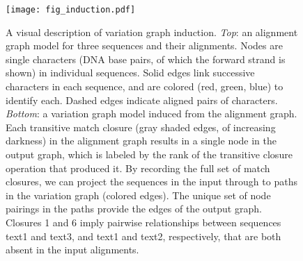 \begin{figure}
   \texttt{[image: fig\_induction.pdf]}
   \caption{
   A visual description of variation graph induction.
   \textit{Top}: an alignment graph model for three sequences and their alignments.
   Nodes are single characters (DNA base pairs, of which the forward strand is shown) in individual sequences.
   Solid edges link successive characters in each sequence, and are colored (red, green, blue) to identify each.
   Dashed edges indicate aligned pairs of characters.
    \textit{Bottom}: a variation graph model induced from the alignment graph.
   Each transitive match closure (gray shaded edges, of increasing darkness) in the alignment graph results in a single node in the output graph, which is labeled by the rank of the transitive closure operation that produced it.
   By recording the full set of match closures, we can project the sequences in the input through to paths in the variation graph (colored edges).
   The unique set of node pairings in the paths provide the edges of the output graph.
   Closures 1 and 6 imply pairwise relationships between sequences text1 and text3, and text1 and text2, respectively, that are both absent in the input alignments.
    }
    \label{fig:induction}
\end{figure}

